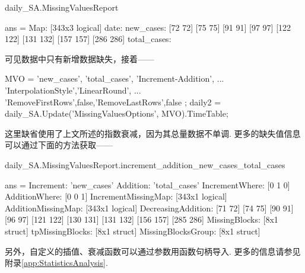\documentclass[a4paper, titlepage]{article}
\begin{document}
\begin{matlabcode}
daily_SA.MissingValuesReport
\end{matlabcode}
\begin{spacing}{0.8}
\begin{matlaboutput}
ans = 
        Map: [343x3 logical]
       date: {}
  new_cases: {[72 72] [75 75] [91 91] [97 97] [122 122] [131 132] [157 157] 
              [286 286]}
total_cases: {}
\end{matlaboutput}
\end{spacing}
可见数据中只有新增数据缺失，接着——
\begin{matlabcode}
MVO = { {'new_cases', 'total_cases'}, 'Increment-Addition', ...
        {'InterpolationStyle','LinearRound', ...
        'RemoveFirstRows',false,'RemoveLastRows',false}
    };
daily2 = daily_SA.Update('MissingValuesOptions', MVO).TimeTable;
\end{matlabcode}
这里缺省使用了上文所述的指数衰减，因为其总量数据不单调. 更多的缺失值信息可以通过下面的方法获取——

\begin{matlabcode}
daily_SA.MissingValuesReport.increment_addition_new_cases_total_cases
\end{matlabcode}
\begin{spacing}{0.8}
\begin{matlaboutput}
ans = 
          Increment: 'new_cases'
           Addition: 'total_cases'
     IncrementWhere: [0 1 0]
      AdditionWhere: [0 0 1]
IncrementMissingMap: [343x1 logical]
 AdditionMissingMap: [343x1 logical]
 DecreasingAddition: {[71 72] [74 75] [90 91] [96 97] [121 122] [130 131] 
                      [131 132] [156 157] [285 286]}
      MissingBlocks: [8x1 struct]
    tpMissingBlocks: [8x1 struct]
 MissingBlocksGroup: [8x1 struct]
\end{matlaboutput}
\end{spacing}
另外，自定义的插值、衰减函数可以通过参数用函数句柄导入. 更多的信息请参见附录\ref{app:StatisticsAnalysis}. 
\end{document}
